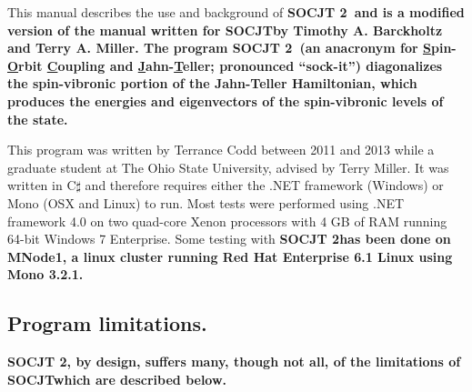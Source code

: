 \documentclass{article}
\newcommand{\ul}{\underline }
\newcommand{\socjttwo}{\bf{SOCJT 2}}
\newcommand{\socjt}{{\bf SOCJT}}
\newcommand{\socrt}{{\bf SOCRT}}
\begin{document}
This manual describes the use and background of \socjttwo\ and is a modified version of the manual written for \socjt by Timothy A. Barckholtz and Terry A. Miller.
The program \socjttwo\ (an anacronym for {\ul S}pin-{\ul O}rbit {\ul C}oupling
and {\ul J}ahn-{\ul T}eller; pronounced ``sock-it'') diagonalizes the
spin-vibronic portion of the Jahn-Teller Hamiltonian, which produces
the energies and eigenvectors of the spin-vibronic levels of the
state.

\begin{comment}
Besides diagonalizing the spin-vibronic Hamiltonian, the programs
\socjt\ and \socrt\ calculate several properties of the system. All of
these properties are detailed later in section \ref{section:output}.
One of the most important items calculated by \socjt\ is the relative
intensities of the vibronic transitions involved in an electronic
transition to and from the degenerate state. These calculations assume
diagonal Franck-Condon factors, and only the intensities of
progressions of the Jahn-Teller active modes are computed. In the main
\socjt\ and \socrt\ programs, it is assumed that the non-Jahn-Teller
active state involved in the electronic transition is a singly
degenerate or non-Jahn-Teller active degenerate state.
\end{comment}

This program was written by Terrance Codd between 2011 and 2013 while
a graduate student at The Ohio State University, advised by Terry
Miller. It was written in C$\sharp$ and therefore requires either the .NET framework (Windows) or Mono (OSX and Linux) to run.  Most tests were performed using .NET framework 4.0 on two quad-core Xenon processors with 4 GB of RAM running 64-bit Windows 7 Enterprise.  Some testing with \socjttwo has been done on MNode1, a linux cluster running Red Hat Enterprise 6.1 Linux using Mono 3.2.1.
\begin{comment}
A version for the Cray
operating system is available upon request, as is the source code for
the DOS versions. This program should be cited as: Barckholtz, T. A.;
Miller, T. A.  {\it Int. Rev. Phys. Chem.}, {\bf 1998}, {\it 17},
435-524.
\end{comment}

\subsection{Program limitations.} \label{section:limitations}
\socjttwo, by design, suffers many, though not all, of the limitations of \socjt which are described below.
\end{document}

